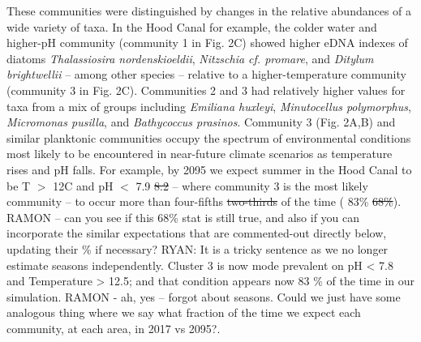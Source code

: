 \documentclass[11pt]{article}
\begin{document}
\begin{linenumbers}
These communities were distinguished by changes in the relative abundances of a wide variety of taxa. In the Hood Canal for example, the colder water and higher-pH community (community 1 in Fig. 2C) showed higher eDNA indexes of diatoms \textit{Thalassiosira nordenskioeldii}, \textit{Nitzschia cf. promare}, and \textit{Ditylum brightwellii} -- among other species -- relative to a higher-temperature community (community 3 in Fig. 2C). Communities 2 and 3 had relatively higher values for taxa from a mix of groups including \textit{Emiliana huxleyi}, \textit{Minutocellus polymorphus}, \textit{Micromonas pusilla}, and \textit{Bathycoccus prasinos}. Community 3 (Fig. 2A,B) and similar planktonic communities occupy the spectrum of environmental conditions most likely to be encountered in near-future climate scenarios as temperature rises and pH falls. For example, by 2095 we expect summer in the Hood Canal to be T $>$ 12\degree C and pH $<$ {\color{red} 7.9  \st{8.2}} -- where community 3 is the most likely community -- to occur more than {\color{red} four-fifths \st{two-thirds}} of the time ({\color{red} 83\%  \st{68\%}}). {\color{red} RAMON -- can you see if this 68\% stat is still true, and also if you can incorporate the similar expectations that are commented-out directly below, updating their \% if necessary?} RYAN: It is a tricky sentence as we no longer estimate seasons independently. Cluster 3 is now mode prevalent on pH < 7.8 and Temperature > 12.5; and that condition appears now 83 \% of the time in our simulation.  {\color{blue} RAMON - ah, yes -- forgot about seasons.  Could we just have some analogous thing where we say what fraction of the time we expect each community, at each area, in 2017 vs 2095?.} \\





\end{linenumbers}
\end{document}
